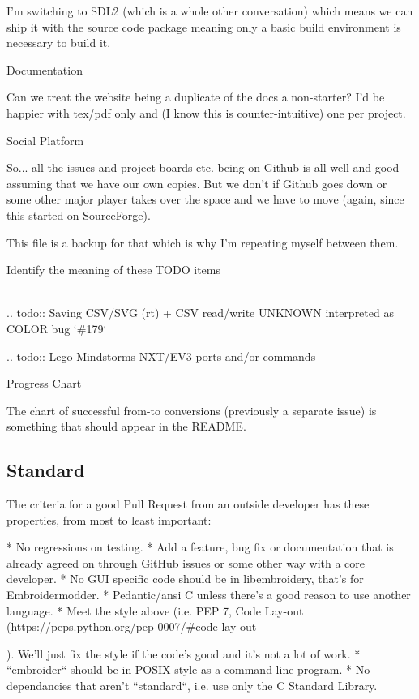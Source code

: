 \documentclass[a4paper]{report}
\begin{document}
{{{{{{I'm switching to SDL2 (which is a whole other conversation) which means
we can ship it with the source code package meaning only a basic build
environment is necessary to build it.

Documentation
~~~~~~~~~~~~~

Can we treat the website being a duplicate of the docs a non-starter?
I'd be happier with tex/pdf only and (I know this is counter-intuitive)
one per project.

Social Platform
~~~~~~~~~~~~~~~

So... all the issues and project boards etc. being on Github is all
well and good assuming that we have our own copies. But we don't if
Github goes down or some other major player takes over the space and we
have to move (again, since this started on SourceForge).

This file is a backup for that which is why I'm repeating myself between
them.

Identify the meaning of these TODO items
~~~~~~~~~~~~~~~~~~~~~~~~~~~~~~~~~~~~~~~~

.. todo::
   Saving CSV/SVG (rt) + CSV read/write UNKNOWN interpreted as COLOR bug `\#179`

.. todo::
   Lego Mindstorms NXT/EV3 ports and/or commands

Progress Chart
~~~~~~~~~~~~~~

The chart of successful from-to conversions (previously a separate issue)
is something that should appear in the README.

\subsection{Standard}

The criteria for a good Pull Request from an outside developer has these properties, from most to least important:

* No regressions on testing.
* Add a feature, bug fix or documentation that is already agreed on through
  GitHub issues or some other way with a core developer.
* No GUI specific code should be in libembroidery, that's for Embroidermodder.
* Pedantic/ansi C unless there's a good reason to use another language.
* Meet the style above (i.e.  PEP 7, Code Lay-out
  (https://peps.python.org/pep-0007/#code-lay-out}). We'll just fix the style
  if the code's good and it's not a lot of work.
* ``embroider`` should be in POSIX style as a command line program.
* No dependancies that aren't ``standard``, i.e. use only the C Standard Library.

}}}}}
\end{document}

